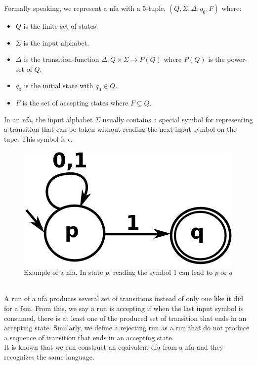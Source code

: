 \documentclass[12pt]{article}
\theoremstyle{definition}
\theoremstyle{definition}
\theoremstyle{remark}
\begin{document}
Formally speaking, we represent a \gls{nfa} with a 5-tuple, $(Q, \Sigma, \Delta, q_0, F)$ where:

\begin{itemize}
\item $Q$ is the finite set of states.
\item $\Sigma$ is the input alphabet.
\item $\Delta$ is the transition-function $\Delta: Q \times \Sigma \rightarrow P(Q)$ where $P(Q)$ is the power-set of $Q$.
\item $q_0$ is the initial state with $q_0 \in Q$.
\item $F$ is the set of accepting states where $F \subseteq Q$.
\end{itemize}

In an \gls{nfa}, the input alphabet $\Sigma$ usually contains a special symbol for representing a transition that can be taken without reading the next input symbol on the tape. This symbol is $\epsilon$.\\

\begin{figure}
    \centering
    \includegraphics[scale=0.4]{graph/nfa.png}
    \caption{Example of a \gls{nfa}. In state $p$, reading the symbol $1$ can lead to $p$ or $q$~\cite{NFA:2017}}
    \label{nfa}
\end{figure}

A run of a \gls{nfa} produces several set of transitions instead of only one like it did for a \gls{fsm}. From this, we say a run is accepting if when the last input symbol is consumed, there is at least one of the produced set of transition that ends in an accepting state. Similarly, we define a rejecting run as a run that do not produce a sequence of transition that ends in an accepting state.\\

It is known that we can construct an equivalent \gls{dfa} from a \gls{nfa} and they recognizes the same language.~\cite{10.1007/3-540-63174-7_12}
\end{document}
